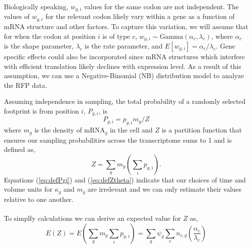 \documentclass{article}
\newcommand{\waitTerm}{\ensuremath{w}\xspace}
\newcommand{\wgi}{\ensuremath{\waitTerm_{g,i}}\xspace}
\newcommand{\alphac}{\ensuremath{{\alpha_c}}\xspace}
\newcommand{\lambdac}{\ensuremath{{\lambda_c}}\xspace}
\newcommand{\pgi}{\ensuremath{{p_{g,i}}}\xspace}
\newcommand{\Pgi}{\ensuremath{{P_{g,i}}}\xspace}
\newcommand{\mg}{\ensuremath{{m_g}}\xspace}
\newcommand{\kappag}{\ensuremath{{\kappa_{g}}}\xspace}
\newcommand{\Ztheta}{\ensuremath{{Z}}\xspace}
\newcommand{\mRNAg}{mRNA$_g$\xspace}
\begin{document}
Biologically speaking, \wgi values for the same codon are not independent.
The values of \wgi for the relevant codon likely vary within a gene as a function of mRNA structure and other factors.
To capture this variation, we will assume that for when the codon at position $i$ is of type $c$, $\wgi \sim \text{Gamma}(\alphac, \lambdac)$, where \alphac is the shape parameter, \lambdac is the rate parameter, and $E[\wgi] = \alphac/\lambdac$. %
Gene specific effects could also be incorporated since  mRNA structures which interfere with efficient translation likely declines with expression level.
As a result of this assumption, we can use a Negative-Binomial (NB) distribution model to analyze the RFP data.


Assuming independence in sampling, the total probability of a randomly selected footprint is from position $i$, $\Pgi$, is
\begin{equation} \label{eq:defPgi}
\Pgi = \pgi \mg/\Ztheta 
\end{equation}
where \mg is the density of \mRNAg in the cell and \Ztheta is a partition function that ensures our sampling probabilities across the transcriptome sums to 1 and is defined as,
\begin{equation}
  \label{eq:defZtheta}
  \Ztheta = \sum_g \mg \left(\sum_i \pgi\right).
\end{equation}
Equations (\ref{eq:defPgi}) and (\ref{eq:defZtheta}) indicate that our choices of time and volume units for \kappag and \mg are irrelevant and we can only estimate their values relative to one another.\\\\
To simplfy calculations we can derive an expected value for $\Ztheta$ as,
\begin{equation}
 \label{eq:defExpZtheta}
 E(\Ztheta) = E(\sum_g m_g \sum_i p_{g,i}) = \sum_g \psi_g \sum_c n_{c,g} (\frac{\alpha_c}{\lambda_c})
\end{equation}

\end{document}
